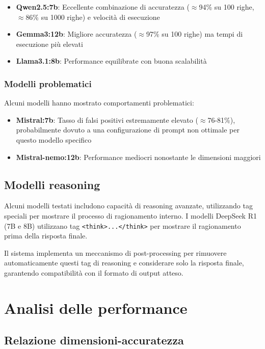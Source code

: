 \documentclass[12pt]{report}
\begin{document}
\begin{itemize}
    \item \textbf{Qwen2.5:7b}: Eccellente combinazione di accuratezza ($\approx$94\% su 100 righe, $\approx$86\% su 1000 righe) e velocità di esecuzione
    \item \textbf{Gemma3:12b}: Migliore accuratezza ($\approx$97\% su 100 righe) ma tempi di esecuzione più elevati
    \item \textbf{Llama3.1:8b}: Performance equilibrate con buona scalabilità
\end{itemize}

\subsubsection{Modelli problematici}
Alcuni modelli hanno mostrato comportamenti problematici:

\begin{itemize}
    \item \textbf{Mistral:7b}: Tasso di falsi positivi estremamente elevato ($\approx$76-81\%), probabilmente dovuto a una configurazione di prompt non ottimale per questo modello specifico
    \item \textbf{Mistral-nemo:12b}: Performance mediocri nonostante le dimensioni maggiori
\end{itemize}

\subsection{Modelli reasoning}
\label{subsec:modelli_reasoning}

Alcuni modelli testati includono capacità di reasoning avanzate, utilizzando tag speciali per mostrare il processo di ragionamento interno. I modelli DeepSeek R1 (7B e 8B) utilizzano tag \texttt{<think>...</think>} per mostrare il ragionamento prima della risposta finale.

Il sistema implementa un meccanismo di post-processing per rimuovere automaticamente questi tag di reasoning e considerare solo la risposta finale, garantendo compatibilità con il formato di output atteso.

\section{Analisi delle performance}
\label{sec:analisi_performance}

\subsection{Relazione dimensioni-accuratezza}
\label{subsec:relazione_dimensioni_accuratezza}
\end{document}
